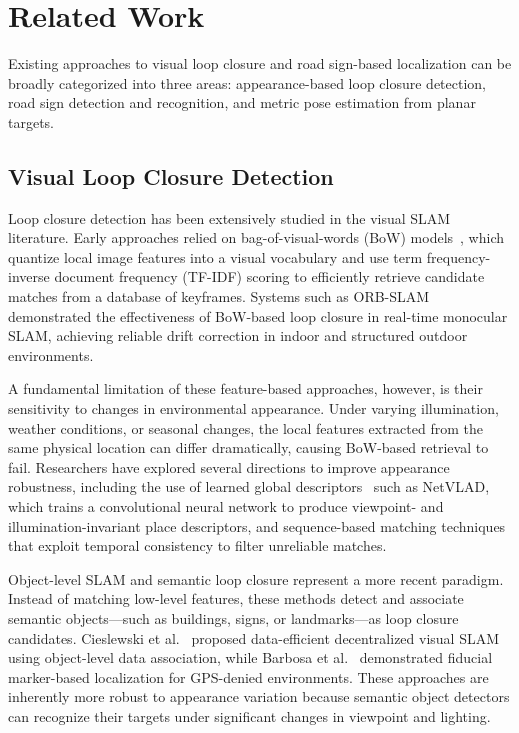 \documentclass[runningheads]{llncs}
\begin{document}
\section{Related Work}

Existing approaches to visual loop closure and road sign-based localization can be broadly categorized into three areas: appearance-based loop closure detection, road sign detection and recognition, and metric pose estimation from planar targets.

\subsection{Visual Loop Closure Detection}

Loop closure detection has been extensively studied in the visual SLAM literature.
Early approaches relied on bag-of-visual-words (BoW) models~\cite{Harris1988}, which
quantize local image features into a visual vocabulary and use term frequency-inverse
document frequency (TF-IDF) scoring to efficiently retrieve candidate matches from a
database of keyframes. Systems such as ORB-SLAM~\cite{Haralick1992} demonstrated
the effectiveness of BoW-based loop closure in real-time monocular SLAM, achieving
reliable drift correction in indoor and structured outdoor environments.

A fundamental limitation of these feature-based approaches, however, is their
sensitivity to changes in environmental appearance. Under varying illumination,
weather conditions, or seasonal changes, the local features extracted from the same
physical location can differ dramatically, causing BoW-based retrieval to fail.
Researchers have explored several directions to improve appearance robustness,
including the use of learned global descriptors~\cite{VanDeWeijer2006} such as
NetVLAD, which trains a convolutional neural network to produce viewpoint- and
illumination-invariant place descriptors, and sequence-based matching techniques
that exploit temporal consistency to filter unreliable matches.

Object-level SLAM and semantic loop closure represent a more recent paradigm.
Instead of matching low-level features, these methods detect and associate semantic
objects---such as buildings, signs, or landmarks---as loop closure candidates.
Cieslewski et al.~\cite{bennett2014chess} proposed data-efficient decentralized
visual SLAM using object-level data association, while Barbosa et al.~\cite{ocamcalib2006}
demonstrated fiducial marker-based localization for GPS-denied environments.
These approaches are inherently more robust to appearance variation because
semantic object detectors can recognize their targets under significant changes in
viewpoint and lighting.
\end{document}
